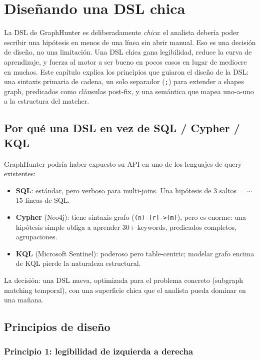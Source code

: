 \chapter{Diseñando una DSL chica}
\label{cap:dsl-design}

\begin{intuicion}
La DSL de GraphHunter es deliberadamente \emph{chica}: el analista
debería poder escribir una hipótesis en menos de una línea sin
abrir manual. Eso es una decisión de diseño, no una limitación.
Una DSL chica gana legibilidad, reduce la curva de aprendizaje, y
fuerza al motor a ser bueno en pocos casos en lugar de mediocre en
muchos. Este capítulo explica los principios que guiaron el diseño
de la DSL: una sintaxis primaria de cadena, un solo separador (\texttt{;})
para extender a shapes graph, predicados como cláusulas
post-fix, y una semántica que mapea uno-a-uno a la estructura del
matcher.
\end{intuicion}

\section{Por qué una DSL en vez de SQL / Cypher / KQL}

GraphHunter podría haber expuesto su API en uno de los lenguajes
de query existentes:

\begin{itemize}
    \item \textbf{SQL}: estándar, pero verboso para multi-joins.
    Una hipótesis de 3 saltos = $\sim$15 líneas de SQL.
    \item \textbf{Cypher} (Neo4j): tiene sintaxis grafo
    (\texttt{(n)-[r]->(m)}), pero es enorme: una hipótesis simple
    obliga a aprender 30+ keywords, predicados completos, agrupaciones.
    \item \textbf{KQL} (Microsoft Sentinel): poderoso pero
    table-centric; modelar grafo encima de KQL pierde la naturaleza
    estructural.
\end{itemize}

\noindent
La decisión: una DSL nueva, optimizada para el problema concreto
(subgraph matching temporal), con una superficie chica que el
analista pueda dominar en una mañana.

\section{Principios de diseño}

\subsection{Principio 1: legibilidad de izquierda a derecha}

